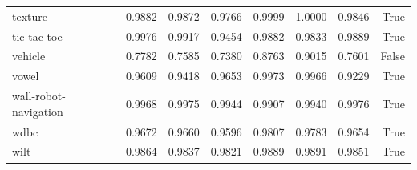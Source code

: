 \begin{table}[htbp]
\begin{tabular}{lrrrrrrr}
texture & 0.9882 & 0.9872 & 0.9766 & 0.9999 & 1.0000 & 0.9846 & True \\
tic-tac-toe & 0.9976 & 0.9917 & 0.9454 & 0.9882 & 0.9833 & 0.9889 & True \\
vehicle & 0.7782 & 0.7585 & 0.7380 & 0.8763 & 0.9015 & 0.7601 & False \\
vowel & 0.9609 & 0.9418 & 0.9653 & 0.9973 & 0.9966 & 0.9229 & True \\
wall-robot-navigation & 0.9968 & 0.9975 & 0.9944 & 0.9907 & 0.9940 & 0.9976 & True \\
wdbc & 0.9672 & 0.9660 & 0.9596 & 0.9807 & 0.9783 & 0.9654 & True \\
wilt & 0.9864 & 0.9837 & 0.9821 & 0.9889 & 0.9891 & 0.9851 & True \\
\hline
\end{tabular}
\end{table}
